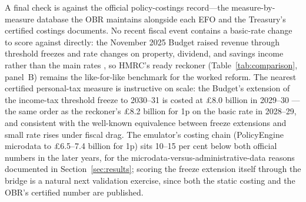 A final check is against the official policy-costings record---the measure-by-measure database the OBR maintains alongside each EFO and the Treasury's certified costings documents. No recent fiscal event contains a basic-rate change to score against directly: the November 2025 Budget raised revenue through threshold freezes and rate changes on property, dividend, and savings income rather than the main rates \citep{hmt2025costings}, so HMRC's ready reckoner (Table~\ref{tab:comparison}, panel~B) remains the like-for-like benchmark for the worked reform. The nearest certified personal-tax measure is instructive on scale: the Budget's extension of the income-tax threshold freeze to 2030--31 is costed at \pounds 8.0 billion in 2029--30 \citep{hmt2025costings, obr2025efo}---the same order as the reckoner's \pounds 8.2 billion for 1p on the basic rate in 2028--29, and consistent with the well-known equivalence between freeze extensions and small rate rises under fiscal drag. The emulator's costing chain (PolicyEngine microdata to \pounds 6.5--7.4 billion for 1p) sits 10--15 per cent below both official numbers in the later years, for the microdata-versus-administrative-data reasons documented in Section~\ref{sec:results}; scoring the freeze extension itself through the bridge is a natural next validation exercise, since both the static costing and the OBR's certified number are published.
